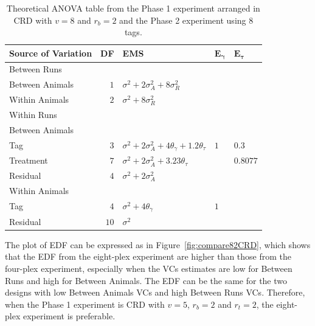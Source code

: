 \documentclass[12pt,a4paper]{article}
\begin{document}
\begin{table}[ht]
\centering
 \caption{Theoretical ANOVA table from the Phase 1 experiment arranged in CRD with $v = 8$ and $r_b = 2$ and the Phase 2 experiment using 8 tags.}
 \begin{tabular}[t]{lrlll} 
 \toprule 
 \multicolumn{1}{l}{\textbf{Source of Variation}} & \multicolumn{1}{l}{\textbf{DF}} & \multicolumn{1}{l}{\textbf{EMS}}& \multicolumn{1}{l}{$\bm{E_{\gamma}}$}&\multicolumn{1}{l}{$\bm{E_{\tau}}$}\\ 
 \midrule 
 Between Runs &  &  & & \\ 
 \quad Between Animals & $1$ & $\sigma^2+2\sigma_{A}^2+8\sigma_{R}^2$ & & \\ 
 \quad Within Animals & $2$ & $\sigma^2+8\sigma_{R}^2$ & & \\ \hline 
 Within Runs &  &  & & \\ 
 \quad Between Animals &  &  & & \\ 
 \quad \quad Tag & $3$ & $\sigma^2+2\sigma_{A}^2+4\theta_{\gamma}+1.2\theta_{\tau}$ &$1$ &  $0.3$\\ 
 \quad \quad Treatment & $7$ & $\sigma^2+2\sigma_{A}^2+3.23\theta_{\tau}$ & & $0.8077$\\ 
 \quad \quad Residual & $4$ & $\sigma^2+2\sigma_{A}^2$ & & \\ \hline 
 \quad Within Animals &  &  & & \\ 
 \quad \quad Tag & $4$ & $\sigma^2+4\theta_{\gamma}$ &$1$ & \\ 
 \quad \quad Residual & $10$ & $\sigma^2$ & & \\ 
 \bottomrule 
 \end{tabular} 
 \label{tab:ANOVAPhaseCRD32} 
\end{table} 

The plot of EDF can be expressed as in Figure~\ref{fig:compare82CRD}, which shows that the EDF from the eight-plex experiment are higher than those from the four-plex experiment, especially when the VCs estimates are low for Between Runs and high for Between Animals. The EDF can be the same for the two designs with low Between Animals VCs and high  Between Runs VCs. Therefore, when the Phase 1 experiment is CRD with $v = 5$, $r_b = 2$ and $r_t = 2$, the eight-plex experiment is preferable.
\end{document}
